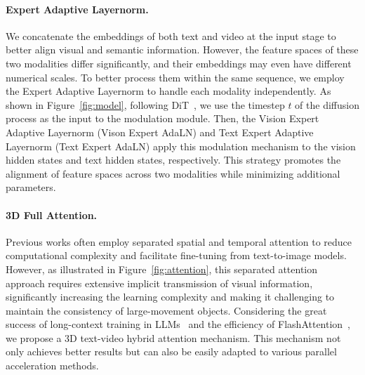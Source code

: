 \paragraph{Expert Adaptive Layernorm.}
We concatenate the embeddings of both text and video at the input stage to better align visual and semantic information. 
However, the feature spaces of these two modalities differ significantly, and their embeddings may even have different numerical scales. 
To better process them within the same sequence, we employ the Expert Adaptive Layernorm to handle each modality independently.
As shown in Figure~\ref{fig:model}, following DiT~\citep{peebles2023scalable}, we use the timestep $t$ of the diffusion process as the input to the modulation module. 
Then, the Vision Expert Adaptive Layernorm (Vison Expert AdaLN) and Text Expert Adaptive Layernorm (Text Expert AdaLN) apply this modulation mechanism to the vision hidden states and text hidden states, respectively. 
This strategy promotes the alignment of feature spaces across two modalities while minimizing additional parameters.




\paragraph{3D Full Attention.}
Previous works \citep{singer2022make, guo2023animatediff} often employ separated spatial and temporal attention to reduce computational complexity and facilitate fine-tuning from text-to-image models. 
However, as illustrated in Figure~\ref{fig:attention}, this separated attention approach requires extensive implicit transmission of visual information, significantly increasing the learning complexity and making it challenging to maintain the consistency of large-movement objects. 
Considering the great success of long-context training in LLMs~\citep{llama3modelcard}  and the efficiency of FlashAttention~\citep{dao2022flashattention},  we propose a 3D text-video hybrid attention mechanism. 
This mechanism not only achieves better results but can also be easily adapted to various parallel acceleration methods. 


